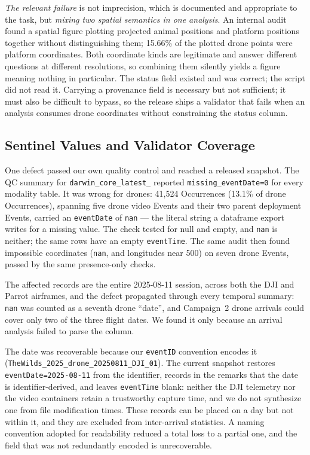 \documentclass[sigconf]{acmart}
\begin{document}
\emph{The relevant failure} is not imprecision, which is documented and
appropriate to the task, but \emph{mixing two spatial semantics in one
analysis}. An internal audit found a spatial figure plotting projected
animal positions and platform positions together without distinguishing
them; 15.66\% of the plotted drone points were platform coordinates.
Both coordinate kinds are legitimate and answer different questions at
different resolutions, so combining them silently yields a figure
meaning nothing in particular. The status field existed and was correct;
the script did not read it. Carrying a provenance field is necessary but
not sufficient; it must also be difficult to bypass, so the release
ships a validator that fails when an analysis consumes drone coordinates
without constraining the status column.

\subsection{Sentinel Values and Validator Coverage}
\label{sec:nulldefect}

One defect passed our own quality control and reached a released
snapshot. The QC summary for \texttt{darwin\_core\_\allowbreak latest\_}
reported \texttt{missing\_\allowbreak eventDate=0} for every modality
table. It was wrong for drones: 41{,}524 Occurrences (13.1\% of drone
Occurrences), spanning five drone video Events and their two parent
deployment Events, carried an \texttt{eventDate} of \texttt{nan} --- the
literal string a dataframe export writes for a missing value. The check
tested for null and empty, and \texttt{nan} is neither; the same rows
have an empty \texttt{eventTime}. The same audit then found impossible
coordinates (\texttt{nan}, and longitudes near 500) on seven drone
Events, passed by the same presence-only checks.

The affected records are the entire 2025-08-11 session, across both the
DJI and Parrot airframes, and the defect propagated through every
temporal summary: \texttt{nan} was counted as a seventh drone ``date'',
and Campaign~2 drone arrivals could cover only two of the three flight
dates. We found it only because an arrival analysis failed to parse the
column.

The date was recoverable because our \texttt{eventID} convention encodes
it (\texttt{TheWilds\_2025\_drone\_20250811\_DJI\_01}). The current
snapshot restores \texttt{eventDate=2025-08-11} from the identifier,
records in the remarks that the date is identifier-derived, and leaves
\texttt{eventTime} blank: neither the DJI telemetry nor the video
containers retain a trustworthy capture time, and we do not synthesize
one from file modification times. These records can be placed on a day
but not within it, and they are excluded from inter-arrival
statistics. A naming convention adopted for readability reduced a total
loss to a partial one, and the field that was not redundantly encoded is
unrecoverable.
\end{document}

